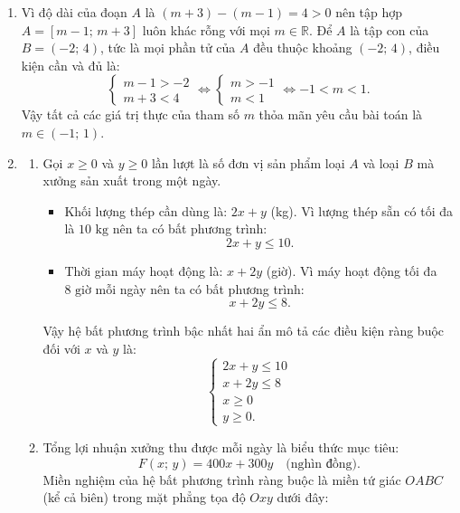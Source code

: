 \documentclass[12pt,a4paper]{article}
\begin{document}
\begin{enumerate}[label=\textbf{Câu \arabic*.},leftmargin=1.1cm]
\begin{enumerate}
\begin{center}
    \end{center}
\end{enumerate}

\item 
Vì độ dài của đoạn $A$ là $(m + 3) - (m - 1) = 4 > 0$ nên tập hợp $A = [m - 1;\, m + 3]$ luôn khác rỗng với mọi $m \in \mathbb{R}$.
Để $A$ là tập con của $B = (-2;\, 4)$, tức là mọi phần tử của $A$ đều thuộc khoảng $(-2;\, 4)$, điều kiện cần và đủ là:
\[
\begin{cases}
m - 1 > -2 \\
m + 3 < 4
\end{cases}
\iff
\begin{cases}
m > -1 \\
m < 1
\end{cases}
\iff -1 < m < 1.
\]
Vậy tất cả các giá trị thực của tham số $m$ thỏa mãn yêu cầu bài toán là $m \in (-1;\, 1)$.

\item 
\begin{enumerate}
    \item Gọi $x \ge 0$ và $y \ge 0$ lần lượt là số đơn vị sản phẩm loại $A$ và loại $B$ mà xưởng sản xuất trong một ngày.
    \begin{itemize}
        \item Khối lượng thép cần dùng là: $2x + y$ (kg). Vì lượng thép sẵn có tối đa là $10\text{ kg}$ nên ta có bất phương trình:
        \[
        2x + y \le 10.
        \]
        \item Thời gian máy hoạt động là: $x + 2y$ (giờ). Vì máy hoạt động tối đa $8\text{ giờ}$ mỗi ngày nên ta có bất phương trình:
        \[
        x + 2y \le 8.
        \]
    \end{itemize}
    Vậy hệ bất phương trình bậc nhất hai ẩn mô tả các điều kiện ràng buộc đối với $x$ và $y$ là:
    \[
    \begin{cases}
    2x + y \le 10 \\
    x + 2y \le 8 \\
    x \ge 0 \\
    y \ge 0.
    \end{cases}
    \]
    \item Tổng lợi nhuận xưởng thu được mỗi ngày là biểu thức mục tiêu:
    \[
    F(x;\, y) = 400x + 300y\quad \text{(nghìn đồng)}.
    \]
    Miền nghiệm của hệ bất phương trình ràng buộc là miền tứ giác $OABC$ (kể cả biên) trong mặt phẳng tọa độ $Oxy$ dưới đây:
    

\end{enumerate}
\end{enumerate}
\end{document}
